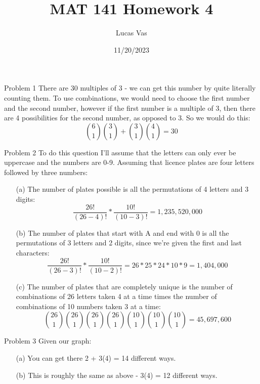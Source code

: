 \documentclass[12pt]{article}
\title{MAT 141 Homework 4}
\author{Lucas Vas}
\date{11/20/2023}
\begin{document}
    
    \maketitle

    \begin{problem}{Problem 1}
        There are 30 multiples of 3 - we can get this number by quite literally counting them. To use combinations,
        we would need to choose the first number and the second number, however if the first number is a multiple of 3,
        then there are 4 possibilities for the second number, as opposed to 3. So we would do this:
        \[\binom{6}{1} \binom{3}{1} + \binom{3}{1} \binom{4}{1} = 30\]
    \end{problem}

    \begin{problem}{Problem 2}
        To do this question I'll assume that the letters can only ever be uppercase and the numbers are 0-9.
        Assuming that licence plates are four letters followed by three numbers:
        \begin{itemize}
            \item[(a)] The number of plates possible is all the permutations of 4 letters and 3 digits:
                \[\frac{26!}{(26-4)!} * \frac{10!}{(10-3)!} = 1,235,520,000\]
            \item[(b)] The number of plates that start with A and end with 0 is all the permutations of
                3 letters and 2 digits, since we're given the first and last characters:
                \[\frac{26!}{(26-3)!} * \frac{10!}{(10-2)!} = 26 * 25 * 24 * 10 * 9 = 1,404,000\]
            \item[(c)] The number of plates that are completely unique is the number of combinations of 26 letters
                taken 4 at a time times the number of combinations of 10 numbers taken 3 at a time:
                \[\binom{26}{1} \binom{26}{1} \binom{26}{1} \binom{26}{1} \binom{10}{1} \binom{10}{1} \binom{10}{1} = 45,697,600\]
        \end{itemize}
    \end{problem}

    \begin{problem}{Problem 3}
        Given our graph:
        \begin{itemize}
            \item[(a)] You can get there 2 + 3(4) = 14 different ways.
            \item[(b)] This is roughly the same as above - 3(4) = 12 different ways.
        \end{itemize}
    \end{problem}
\end{document}

